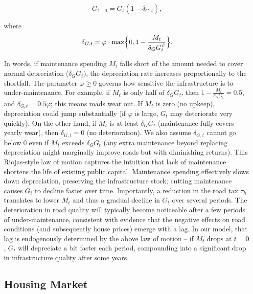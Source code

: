 \begin{equation}
    G_{t+1} = G_t (1 - \delta_{G,t}) ,\label{eq:roads}
\end{equation}

where
\begin{equation}
\delta_{G,t} = \varphi \cdot \max\Bigl\{0,  1 - \frac{M_t}{\delta_G G_{t}^{\psi}} \Bigr\}.
\end{equation}

\vskip 0.3cm

In words, if maintenance spending $M_t$ falls short of the amount needed to cover normal depreciation ($\delta_G G_t$), the depreciation rate increases proportionally to the shortfall. The parameter $\varphi \ge 0$ governs how sensitive the infrastructure is to under-maintenance. For example, if $M_t$ is only half of $\delta_G G_t$, then $1 - \frac{M_t}{\delta_G G_t} = 0.5$, and $\delta_{G,t} = 0.5\varphi$; this means roads wear out. If $M_t$ is zero (no upkeep), depreciation could jump substantially (if $\varphi$ is large, $G_t$ may deteriorate very quickly). On the other hand, if $M_t$ is at least $\delta_G G_t$ (maintenance fully covers yearly wear), then $\delta_{G,t}=0$ (no deterioration). We also assume $\delta_{G,t}$ cannot go below 0 even if $M_t$ exceeds $\delta_G G_t$ (any extra maintenance beyond replacing depreciation might marginally improve roads but with diminishing returns). This Riojas-style law of motion captures the intuition that lack of maintenance shortens the life of existing public capital. Maintenance spending effectively slows down depreciation, preserving the infrastructure stock; cutting maintenance causes $G_t$ to decline faster over time. Importantly, a reduction in the road tax $\tau_h$ translates to lower $M_t$ and thus a gradual decline in $G_t$ over several periods. The deterioration in road quality will typically become noticeable after a few periods of under-maintenance, consistent with evidence that the negative effects on road conditions (and subsequently house prices) emerge with a lag. In our model, that lag is endogenously determined by the above law of motion – if $M_t$ drops at $t=0$, $G_t$ will depreciate a bit faster each period, compounding into a significant drop in infrastructure quality after some years.

\subsection{Housing Market}

